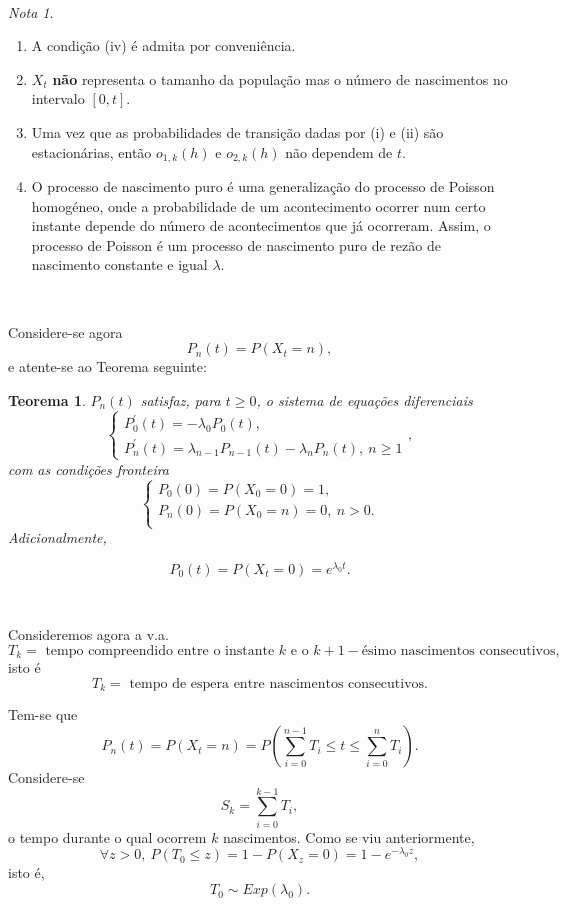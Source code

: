 \documentclass[
  11pt,
  a4paper,
]{book}
\newtheorem{theorem}{Teorema}[chapter]
\theoremstyle{definition}
\theoremstyle{definition}
\theoremstyle{definition}
\theoremstyle{definition}
\theoremstyle{remark}
\newtheorem*{remark}{Nota }
\begin{document}
\(\,\)

\begin{remark}
\leavevmode

\begin{enumerate}
\def\labelenumi{\arabic{enumi}.}
\item
  A condição (iv) é admita por conveniência.
\item
  \(X_t\) \textbf{não} representa o tamanho da população mas o número de nascimentos no intervalo \([0,t]\).
\item
  Uma vez que as probabilidades de transição dadas por (i) e (ii) são estacionárias, então \(o_{1,k}(h)\) e \(o_{2,k}(h)\) não dependem de \(t\).
\item
  O processo de nascimento puro é uma generalização do processo de Poisson homogéneo, onde a probabilidade de um acontecimento ocorrer num certo instante depende do número de acontecimentos que já ocorreram. Assim, o processo de Poisson é um processo de nascimento puro de rezão de nascimento constante e igual \(\lambda\).
\end{enumerate}

\end{remark}

\(\,\)

Considere-se agora
\[P_n(t)=P(X_t=n),\]
e atente-se ao Teorema seguinte:

\begin{theorem}
\(P_n(t)\) satisfaz, para \(t \geq 0\), o sistema de equações diferenciais
\[
\begin{cases}
P^{\prime}_0(t)=-\lambda_0 P_0(t), \\
P^{\prime}_n(t)=\lambda_{n-1} P_{n-1}(t) - \lambda_n P_n(t), ~ n \geq 1
\end{cases},
\]
com as condições fronteira
\[
\begin{cases}
P_0(0)=P(X_0=0)=1, \\
P_n(0)=P(X_0=n)=0, ~ n >0.\\
\end{cases}
\]
Adicionalmente,

\[P_0(t)=P(X_t=0)=e^{\lambda_0 t}.\]
\end{theorem}

\(\,\)

Consideremos agora a v.a.
\[T_k= \text{ tempo compreendido entre o instante } k \text{ e o } k+1-\text{ésimo nascimentos consecutivos},\]
isto é
\[T_k= \text{ tempo de espera entre nascimentos consecutivos}.\]

Tem-se que
\[P_n(t)=P(X_t=n)=P\left(\sum\limits_{i=0}^{n-1}T_i \leq t \leq \sum\limits_{i=0}^{n}T_i\right).\]
Considere-se
\[S_k=\sum\limits_{i=0}^{k-1}T_i,\]
o tempo durante o qual ocorrem \(k\) nascimentos. Como se viu anteriormente,
\[\forall z >0, ~P(T_0 \leq z)= 1-P(X_z=0)=1-e^{-\lambda_0 z},\]
isto é,
\[T_0 \sim Exp(\lambda_0).\]
\end{document}
